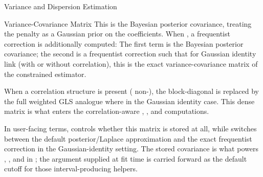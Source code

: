 \begin{Section}{Variance and Dispersion Estimation}
\begin{SubSection}{Variance-Covariance Matrix}
This is the Bayesian posterior covariance, treating the penalty as a
Gaussian prior on the coefficients. When ,
a frequentist correction is additionally computed:
The first term is the Bayesian posterior covariance; the second is a frequentist
correction such that for Gaussian identity link (with or without correlation),
this is the exact variance-covariance matrix of the constrained estimator.

When a correlation structure is present ( non-),
the block-diagonal  is replaced by the full weighted GLS
analogue
where  in the Gaussian identity case.
This dense matrix is what enters the correlation-aware ,
, and
computations.

In user-facing terms,  controls whether this matrix is
stored at all, while  switches between the default
posterior/Laplace approximation and the exact frequentist correction in the
Gaussian-identity setting. The stored covariance is what powers
, , and
 in ; the
 argument supplied at fit time is carried forward as the
default cutoff for those interval-producing helpers.
\end{SubSection}



\end{Section}
